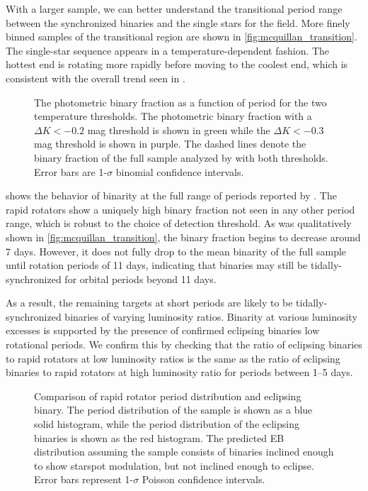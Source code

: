 \documentclass[manuscript]{aastex6}
\begin{document}
With a larger sample, we can better understand the transitional period range
between the synchronized binaries and the single stars for the field. More
finely binned samples of the transitional region are shown in
\cref{fig:mcquillan_transition}. The single-star sequence appears in a
temperature-dependent fashion. The hottest end is rotating more rapidly before
moving to the coolest end, which is consistent with the overall trend seen in 
\citet{McQuillan14}.

\begin{figure}[htb]
    \centering
    \caption{The photometric binary fraction as a function of period for the
        two temperature thresholds. The photometric binary fraction with a
        \(\Delta K < -0.2\) mag threshold is shown in green while the \(\Delta
        K < -0.3\) mag threshold is shown in purple. The dashed lines denote
        the binary fraction of the full sample analyzed by \citet{McQuillan14}
        with both thresholds. Error bars are 1-\(\sigma\) binomial confidence 
    intervals.}\label{fig:binary_fraction}
\end{figure}

 shows the behavior of binarity at the full range of
periods reported by \citet{McQuillan14}. The rapid rotators show a uniquely
high binary fraction not seen in any other period range, which is robust to the
choice of detection threshold. As was qualitatively shown in 
\cref{fig:mcquillan_transition}, the binary fraction begins to decrease around 
7 days. However, it does not fully drop to the mean binarity of
the full sample until rotation periods of 11 days, indicating that
binaries may still be tidally-synchronized for orbital periods beyond 11 days. 

As a result, the remaining targets at short periods are likely to be
tidally-synchronized binaries of varying luminosity ratios. Binarity at various
luminosity excesses is supported by the presence of confirmed eclipsing
binaries low rotational periods. We confirm this by checking that the ratio of
eclipsing binaries to rapid rotators at low luminosity ratios is the same as
the ratio of eclipsing binaries to rapid rotators at high luminosity ratio for
periods between 1--5 days.

\begin{figure}[htb]
    \centering
    \caption{Comparison of rapid rotator period distribution and eclipsing
    binary. The period distribution of the \citep{McQuillan14} sample is shown
as a blue solid histogram, while the period distribution of the eclipsing binaries
is shown as the red histogram. The predicted EB distribution assuming the
\citep{McQuillan14} sample consists of binaries inclined enough to show
starspot modulation, but not inclined enough to eclipse. Error bars represent
1-\(\sigma\) Poisson confidence intervals.}\label{fig:eclipseprob}
\end{figure}
\end{document}
